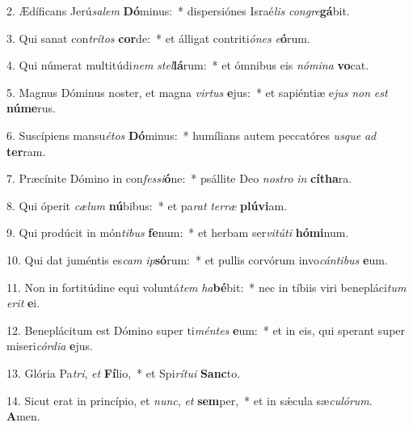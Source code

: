 2. Ædíficans Jerú\textit{sa}\textit{lem} \textbf{Dó}minus:~*  dispersiónes Israé\textit{lis} \textit{con}\textit{gre}\textbf{gá}bit.\

3. Qui sanat con\textit{trí}\textit{tos} \textbf{cor}de:~*  et álligat contriti\textit{ó}\textit{nes} \textit{e}\textbf{ó}rum.\

4. Qui númerat multitúdi\textit{nem} \textit{stel}\textbf{lá}rum:~*  et ómnibus eis \textit{nó}\textit{mi}\textit{na} \textbf{vo}cat.\

5. Magnus Dóminus noster, et magna \textit{vir}\textit{tus} \textbf{e}jus:~*  et sapiéntiæ e\textit{jus} \textit{non} \textit{est} \textbf{nú}\textbf{me}rus.\

6. Suscípiens mansu\textit{é}\textit{tos} \textbf{Dó}minus:~*  humílians autem peccatóres \textit{us}\textit{que} \textit{ad} \textbf{ter}ram.\

7. Præcínite Dómino in con\textit{fes}\textit{si}\textbf{ó}ne:~*  psállite Deo \textit{nos}\textit{tro} \textit{in} \textbf{cí}\textbf{tha}ra.\

8. Qui óperit \textit{cæ}\textit{lum} \textbf{nú}bibus:~*  et pa\textit{rat} \textit{ter}\textit{ræ} \textbf{plú}\textbf{vi}am.\

9. Qui prodúcit in món\textit{ti}\textit{bus} \textbf{fe}num:~*  et herbam ser\textit{vi}\textit{tú}\textit{ti} \textbf{hó}\textbf{mi}num.\

10. Qui dat juméntis es\textit{cam} \textit{ip}\textbf{só}rum:~*  et pullis corvórum invo\textit{cán}\textit{ti}\textit{bus} \textbf{e}um.\

11. Non in fortitúdine equi voluntá\textit{tem} \textit{ha}\textbf{bé}bit:~*  nec in tíbiis viri benepláci\textit{tum} \textit{e}\textit{rit} \textbf{e}i.\

12. Beneplácitum est Dómino super ti\textit{mén}\textit{tes} \textbf{e}um:~*  et in eis, qui sperant super miseri\textit{cór}\textit{di}\textit{a} \textbf{e}jus.\

13. Glória Pa\textit{tri}, \textit{et} \textbf{Fí}lio,~*  et Spi\textit{rí}\textit{tu}\textit{i} \textbf{Sanc}to.\

14. Sicut erat in princípio, et \textit{nunc}, \textit{et} \textbf{sem}per,~*  et in sǽcula sæ\textit{cu}\textit{ló}\textit{rum}. \textbf{A}men.\

